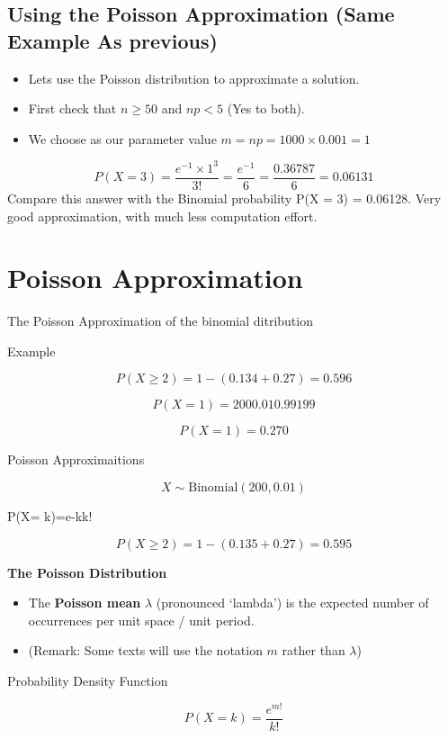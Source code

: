 \subsection{Using the Poisson Approximation (Same Example As previous)}
\begin{itemize}
\item Lets use the Poisson distribution to approximate a solution.
\item First check that $n \geq 50$ and $np < 5$ (Yes to both).
\item We choose as our parameter value $m = np = 1000 \times 0.001 = 1$
\end{itemize}
\[P(X = 3) = \frac{e^{-1} \times 1^3}{3!} = \frac{e^{-1}}{6} = \frac{0.36787}{6} = 0.06131 \]
Compare this answer with the Binomial probability
P(X = 3) = 0.06128.
Very good approximation, with much less computation effort.






\section{Poisson Approximation}
The Poisson Approximation of the binomial ditribution

Example

\[P(X \geq 2) = 1 - (0.134+0.27) = 0.596\]

\[P(X=1) = 200 0.01 0.99 199\]

\[P(X=1) = 0.270\]


Poisson Approximaitions


\[X \sim \mbox{Binomial}(200, 0.01) \]


P(X= k)=e-kk!




\[P(X \geq 2) = 1- (0.135+0.27) = 0.595\]






\noindent \textbf{The Poisson Distribution}
{
\begin{itemize}
\item The \textbf{Poisson mean} $\lambda$ (pronounced `lambda') is the expected number of occurrences per unit space / unit period.
\item (Remark:  Some texts will use the notation $m$ rather than $\lambda$)
\end{itemize}



Probability Density Function

\[P(X=k) = \frac{e^{m!}}{k!}\]
}





